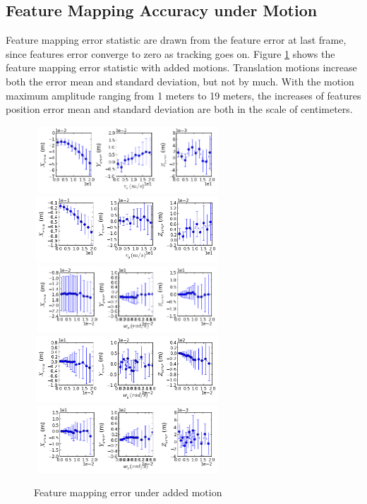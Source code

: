 \subsection{Feature Mapping Accuracy under Motion}\label{sec:featureMotion}

Feature mapping error statistic are drawn from the feature error at
last frame, since features error converge to zero as tracking goes on.
Figure \ref{fig:simfig20-24} shows the feature mapping error statistic
with added motions. Translation motions increase both the error mean
and standard deviation, but not by much. With the motion maximum
amplitude ranging from 1 meters to 19 meters, the increases of
features position error mean and standard deviation are both in the
scale of centimeters.

\begin{figure}[h]
  \centering
  \includegraphics[width=7cm, height=2.5cm]{./Figures/SimulationFigures/Figure20.png}
  \includegraphics[width=7cm, height=2.5cm]{./Figures/SimulationFigures/Figure21.png}
  \includegraphics[width=7cm, height=2.5cm]{./Figures/SimulationFigures/Figure22.png}
  \includegraphics[width=7cm, height=2.5cm]{./Figures/SimulationFigures/Figure23.png}
  \includegraphics[width=7cm, height=2.5cm]{./Figures/SimulationFigures/Figure24.png}
  \caption{Feature mapping error under added motion}
  \label{fig:simfig20-24}
\end{figure}

